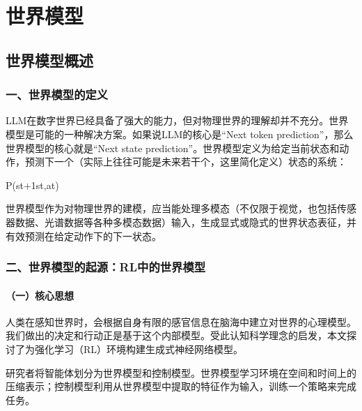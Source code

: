 \hypertarget{ux4e16ux754cux6a21ux578b}{%
\chapter{世界模型}\label{ux4e16ux754cux6a21ux578b}}

\hypertarget{ux4e16ux754cux6a21ux578bux6982ux8ff0}{%
\section{世界模型概述}\label{ux4e16ux754cux6a21ux578bux6982ux8ff0}}

\hypertarget{ux4e00ux4e16ux754cux6a21ux578bux7684ux5b9aux4e49}{%
\subsection{一、世界模型的定义}\label{ux4e00ux4e16ux754cux6a21ux578bux7684ux5b9aux4e49}}

LLM在数字世界已经具备了强大的能力，但对物理世界的理解却并不充分。世界模型是可能的一种解决方案。如果说LLM的核心是``Next token prediction''，那么世界模型的核心就是``Next state prediction''。世界模型定义为给定当前状态和动作，预测下一个（实际上往往可能是未来若干个，这里简化定义）状态的系统：

P(st+1\textbar st,at)

世界模型作为对物理世界的建模，应当能处理多模态（不仅限于视觉，也包括传感器数据、光谱数据等各种多模态数据）输入，生成显式或隐式的世界状态表征，并有效预测在给定动作下的下一状态。

\hypertarget{ux4e8cux4e16ux754cux6a21ux578bux7684ux8d77ux6e90rlux4e2dux7684ux4e16ux754cux6a21ux578b}{%
\subsection{二、世界模型的起源：RL中的世界模型}\label{ux4e8cux4e16ux754cux6a21ux578bux7684ux8d77ux6e90rlux4e2dux7684ux4e16ux754cux6a21ux578b}}

\hypertarget{ux4e00ux6838ux5fc3ux601dux60f3-17}{%
\subsubsection{（一）核心思想}\label{ux4e00ux6838ux5fc3ux601dux60f3-17}}

人类在感知世界时，会根据自身有限的感官信息在脑海中建立对世界的心理模型。我们做出的决定和行动正是基于这个内部模型。受此认知科学理念的启发，本文探讨了为强化学习（RL）环境构建生成式神经网络模型。

研究者将智能体划分为世界模型和控制模型。世界模型学习环境在空间和时间上的压缩表示；控制模型利用从世界模型中提取的特征作为输入，训练一个策略来完成任务。

